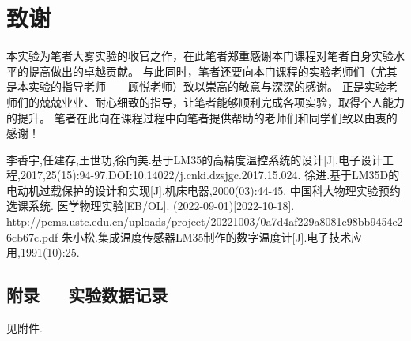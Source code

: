 \documentclass[a4paper,12pt]{article}%
\begin{document}
\section{致谢}
\begin{spacing}{1.528}%
    本实验为笔者大雾实验的收官之作，在此笔者郑重感谢本门课程对笔者自身实验水平的提高做出的卓越贡献。
    与此同时，笔者还要向本门课程的实验老师们（尤其是本实验的指导老师——顾悦老师）致以崇高的敬意与深深的感谢。
    正是实验老师们的兢兢业业、耐心细致的指导，让笔者能够顺利完成各项实验，取得个人能力的提升。
    笔者在此向在课程过程中向笔者提供帮助的老师们和同学们致以由衷的感谢！
\end{spacing}

\newpage
\begin{thebibliography}{23}%
    李香宇,任建存,王世功,徐向美.基于LM35的高精度温控系统的设计[J].电子设计工程,2017,25(15):94-97.DOI:10.14022/j.cnki.dzsjgc.2017.15.024.
    徐进.基于LM35D的电动机过载保护的设计和实现[J].机床电器,2000(03):44-45.
    中国科大物理实验预约选课系统. 医学物理实验[EB/OL]. (2022-09-01)[2022-10-18]. http://pems.ustc.edu.cn/uploads/project/20221003/0a7d4af229a8081e98bb9454e26cb67c.pdf
    朱小松.集成温度传感器LM35制作的数字温度计[J].电子技术应用,1991(10):25.
\end{thebibliography}

\begin{appendices}
\section*{附录~~~实验数据记录}
\begin{spacing}{1.528}%
    见附件.~~
\end{spacing}
\end{appendices}
\end{document}
